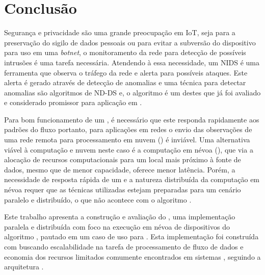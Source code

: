 
\chapter{Conclusão}\label{cha:final}


Segurança e privacidade são uma grande preocupação em \acf{IoT}, seja para a
preservação do sigilo de dados pessoais ou para evitar a subversão do
dispositivo para uso em uma \emph{botnet}, o monitoramento da rede para detecção
de possíveis intrusões é uma tarefa necessária.
Atendendo à essa necessidade, um \acf{NIDS} é uma ferramenta que observa o
tráfego da rede e alerta para possíveis ataques.
Este alerta é gerado através de detecção de anomalias e uma técnica para
detectar anomalias são algoritmos de \acf{ND-DS} e, o algoritmo \minas é um
destes que já foi avaliado e considerado promissor para aplicação em \nids.

Para bom funcionamento de um \nids, é necessário que este responda rapidamente
aos padrões do fluxo portanto, para aplicações em redes \iot o envio das
observações de uma rede remota para processamento em nuvem (\cloud) é inviável.
Uma alternativa viável à computação e nuvem neste caso é a computação em névoa
(\fog), que via a alocação de recursos computacionais para um local mais próximo
à fonte de dados, mesmo que de menor capacidade, oferece menor latência.
Porém, a necessidade de resposta rápida de um \nids e a natureza distribuída da
computação em névoa requer que as técnicas utilizadas estejam preparadas para
um cenário paralelo e distribuído, o que não acontece com o algoritmo \minas.

Este trabalho apresenta a construção e avaliação do \mfog, uma implementação
paralela e distribuída com foco na execução em névoa de dispositivos \iot do
algoritmo \minas, pautado em um caso de uso para \nids.
Esta implementação foi construída com \mpi buscando escalabilidade na tarefa de
processamento de fluxo de dados e economia dos recursos limitados comumente
encontrados em sistemas \iot, seguindo a arquitetura \arch \cite{Cassales2019a}.

